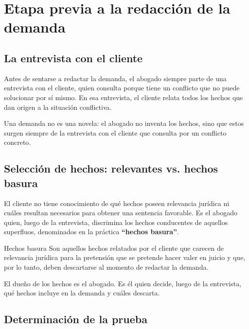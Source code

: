\documentclass[12pt,oneside]{book}
\begin{document}
\chapter{Etapa previa a la redacción de la demanda}

\section{La entrevista con el cliente}

Antes de sentarse a redactar la demanda, el abogado siempre parte de una entrevista con el cliente, quien consulta porque tiene un conflicto que no puede solucionar por sí mismo. En esa entrevista, el cliente relata todos los hechos que dan origen a la situación conflictiva.

\begin{important}
Una demanda no es una novela: el abogado no inventa los hechos, sino que estos surgen siempre de la entrevista con el cliente que consulta por un conflicto concreto.
\end{important}

\section{Selección de hechos: relevantes vs. hechos basura}

El cliente no tiene conocimiento de qué hechos poseen relevancia jurídica ni cuáles resultan necesarios para obtener una sentencia favorable. Es el abogado quien, luego de la entrevista, discrimina los hechos conducentes de aquellos superfluos, denominados en la práctica \textbf{``hechos basura''}.

\begin{definition}{Hechos basura}
Son aquellos hechos relatados por el cliente que carecen de relevancia jurídica para la pretensión que se pretende hacer valer en juicio y que, por lo tanto, deben descartarse al momento de redactar la demanda.
\end{definition}

\begin{important}
El dueño de los hechos es el abogado. Es él quien decide, luego de la entrevista, qué hechos incluye en la demanda y cuáles descarta.
\end{important}

\section{Determinación de la prueba}
\end{document}
